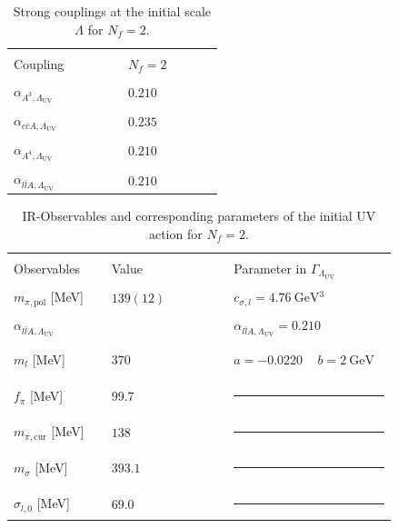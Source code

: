 \documentclass[aps,twocolumn,prd,superscriptaddress]{revtex4-2}
\begin{document}
%
\begin{table}[hb!]\centering
	\begin{tabular}{|>{\centering}m{0.3\linewidth} | >{\centering\arraybackslash}m{0.25\linewidth} |}
		\hline & \\[-1ex]
		Coupling & $N_f=2$ \\[1ex]
		\hline& \\[-1ex]
		$\alpha_{A^3,\Lambda_\textrm{UV}}$  & $0.210$   \\[1.5ex]
		\hline& \\[-1.5ex]
		$\alpha_{c\bar c A,\Lambda_\textrm{UV}}$ &  $0.235$ 
		\\[1.5ex] 
		\hline& \\[-1.5ex]
		$\alpha_{A^4,\Lambda_\textrm{UV}}$  & $0.210$  \\[1.5ex]
		\hline& \\[-1.5ex]
		$\alpha_{l\bar l A,\Lambda_\textrm{UV}}$ & $0.210$
		\\[1.5ex]
		\hline
	\end{tabular}
	\caption{Strong couplings at the initial scale $\Lambda$ for $N_f = 2$.
		\hspace*{\fill} }
	\label{tab:alphasNf2}
\end{table}
%
%
\begin{table}[hb!]\centering
	\begin{tabular}{|>{\centering}m{0.24\linewidth} ||>{\centering}m{0.3\linewidth}|| >{\centering\arraybackslash}m{0.4\linewidth} |}
		\hline & & \\[-1ex]
		Observables & Value & Parameter in $\Gamma_{\Lambda_\textrm{UV}}$\\[1ex]
		\hline& & \\[-1ex]
		$m_{\pi,\textrm{pol}}$ [MeV]      & $139(12)$ & $c_{\sigma,l}=\qty{4.76}{\GeV^3}$ \\ [1ex]
		\hline & & \\[-1ex]
		$\alpha_{l\bar l A ,\Lambda_\textrm{UV}}$   &    &  $\alpha_{l\bar l A,\Lambda_\textrm{UV}} = 0.210$ \\[1ex]
		\hline& &\\[-2ex]
		\hline & & \\[-1ex]
		$m_l$ [MeV]      &  $370$  & $a=-0.0220\,\quad b=\qty{2}{\GeV}$
		\\[1ex]  
		\hline& &\\[-2ex]
		\hline & & \\[-1ex]
		$f_\pi$ [MeV]      &  $99.7$ & \noindent\rule{1cm}{0.4pt}		\\[1ex]
		\hline& &\\[-1ex] 
		$m_{\pi,\textrm{cur}}$ [MeV]      &  $138$& \noindent\rule{1cm}{0.4pt}		\\[1ex]
		\hline& &\\[-1ex] 
		$m_\sigma$ [MeV]      &  $393.1$ &	\noindent\rule{1cm}{0.4pt} \\[1ex]  
		\hline& &\\[-1ex] 
		$\sigma_{l,0}$ [MeV]      &  $69.0$ & 	\noindent\rule{1cm}{0.4pt} \\[1ex]  
		\hline
	\end{tabular}
	\caption{IR-Observables and corresponding parameters of the initial UV action for $N_f=2$.
		\hspace*{\fill}}
	\label{tab:resultsNf2} 
\end{table}
\end{document}
